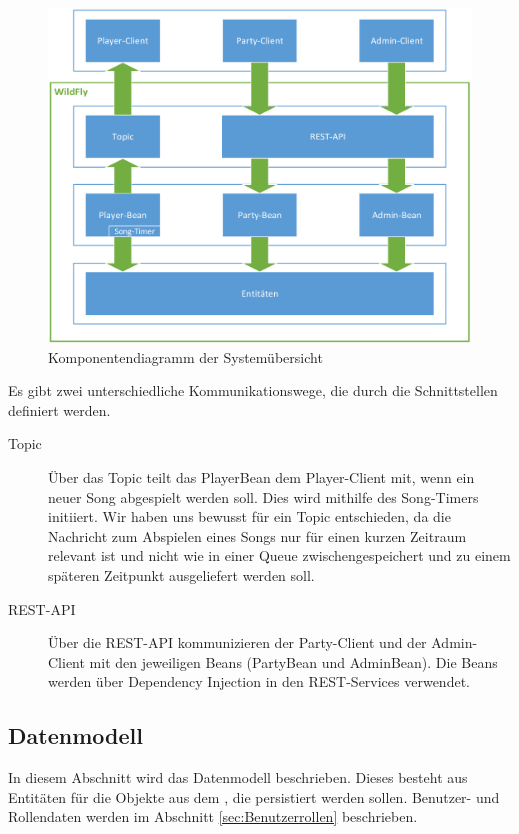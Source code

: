 \begin{figure}[H]
	\centering
	\includegraphics[width=0.9\linewidth]{Bilder/ArchitekturGesamt}
	\caption{Komponentendiagramm der Systemübersicht }
	\label{fig:ArchitekturGesamtDiagramm}
\end{figure}

Es gibt zwei unterschiedliche Kommunikationswege, die durch die Schnittstellen definiert werden. 

\begin{description}
\item [Topic] Über das Topic teilt das PlayerBean dem Player-Client mit, wenn ein neuer Song abgespielt werden soll. Dies wird mithilfe des Song-Timers initiiert. Wir haben uns bewusst für ein Topic entschieden, da die Nachricht zum Abspielen eines Songs nur für einen kurzen Zeitraum relevant ist und nicht wie in einer Queue zwischengespeichert und zu einem späteren Zeitpunkt ausgeliefert werden soll. 
\item [REST-API]
Über die REST-API kommunizieren der Party-Client und der Admin-Client mit den jeweiligen Beans (PartyBean und AdminBean). Die Beans werden über Dependency Injection in den REST-Services verwendet. 
\end{description}


\subsection{Datenmodell}

In diesem Abschnitt wird das Datenmodell beschrieben. Dieses besteht aus Entitäten für die Objekte aus dem , die persistiert werden sollen. Benutzer- und Rollendaten werden im Abschnitt \ref{sec:Benutzerrollen} beschrieben.

